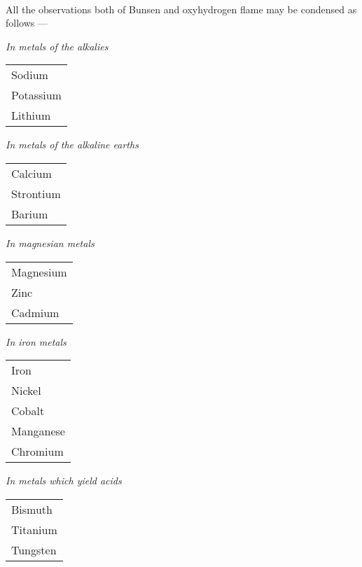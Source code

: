\documentclass[a4paper, 12pt, oneside, polutonikogreek, english]{article}
\begin{document}
\paragraph{}
All the observations both of Bunsen and oxyhydrogen flame may be condensed as follows ---

\vspace{5mm}

\emph{In metals of the alkalies}
\begin{table}[H]
    \centering
    \begin{tabular}{l}
    Sodium \\
    Potassium \\
    Lithium \\
    \end{tabular}
\end{table}

\emph{In metals of the alkaline earths}
\begin{table}[H]
    \centering
    \begin{tabular}{l}
    Calcium \\
    Strontium \\
    Barium \\
    \end{tabular}
\end{table}

\emph{In magnesian metals}
\begin{table}[H]
    \centering
    \begin{tabular}{l}
    Magnesium \\
    Zinc \\
    Cadmium \\
    \end{tabular}
\end{table}

\emph{In iron metals}
\begin{table}[H]
    \centering
    \begin{tabular}{l}
    Iron \\
    Nickel \\
    Cobalt \\
    Manganese \\
    Chromium \\
    \end{tabular}
\end{table}

\emph{In metals which yield acids}
\begin{table}[H]
    \centering
    \begin{tabular}{l}
    Bismuth \\
    Titanium \\
    Tungsten \\
    \end{tabular}
\end{table}
\end{document}
